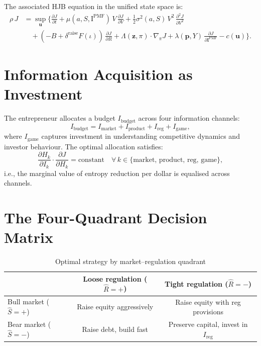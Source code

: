 \documentclass[12pt,a4paper,oneside]{book}
\theoremstyle{definition}
\theoremstyle{remark}
\newcommand{\MI}{\mathrm{I}}
\begin{document}
The associated HJB equation in the unified state space is:
\begin{equation}\label{eq:master_hjb}
\boxed{
\begin{aligned}
  \rho\,J &= \sup_{\mathbf{u}} \biggl\{
    \frac{\partial J}{\partial t}
    + \mu(a, S, \MI^{\text{PMF}})\,V\,\frac{\partial J}{\partial V}
    + \frac{1}{2}\sigma^2(a,S)\,V^2\,\frac{\partial^2 J}{\partial V^2} \\
  &\quad + (-B + \delta^{\text{raise}} F(\iota))\,
    \frac{\partial J}{\partial R}
    + \Lambda(\mathbf{z},\pi) \cdot \nabla_\pi J
    + \lambda(\mathbf{p}, Y)\,\frac{\partial J}{\partial \MI^{\text{PMF}}}
    - c(\mathbf{u}) \biggr\}.
\end{aligned}
}
\end{equation}

\section{Information Acquisition as Investment}

The entrepreneur allocates a budget $I_{\text{budget}}$ across four
information channels:
\begin{equation}\label{eq:info_budget}
  I_{\text{budget}} = I_{\text{market}} + I_{\text{product}}
    + I_{\text{reg}} + I_{\text{game}},
\end{equation}
where $I_{\text{game}}$ captures investment in understanding competitive dynamics
and investor behaviour. The optimal allocation satisfies:
\begin{equation}\label{eq:info_foc}
  \frac{\partial H_k}{\partial I_k} \cdot \frac{\partial J}{\partial H_k}
  = \text{constant} \quad \forall\, k \in \{\text{market, product, reg, game}\},
\end{equation}
i.e., the marginal value of entropy reduction per dollar is equalised across channels.

\section{The Four-Quadrant Decision Matrix}

\begin{table}[H]
\centering
\caption{Optimal strategy by market--regulation quadrant}
\label{tab:quadrant}
\begin{tabular}{@{}lcc@{}}
\toprule
& Loose regulation ($\hat{R} = +$) & Tight regulation ($\hat{R} = -$) \\
\midrule
Bull market ($\hat{S} = +$) &
  Raise equity aggressively &
  Raise equity with reg provisions \\
Bear market ($\hat{S} = -$) &
  Raise debt, build fast &
  Preserve capital, invest in $I_{\text{reg}}$ \\
\bottomrule
\end{tabular}
\end{table}
\end{document}
